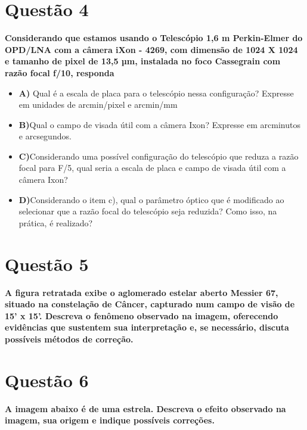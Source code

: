 \documentclass[a4paper, 12pt]{article}
\begin{document}
\section*{Questão 4}
\noindent \textbf{Considerando que estamos usando o Telescópio 1,6 m Perkin-Elmer do OPD/LNA com a câmera iXon - 4269, com dimensão de 1024 X 1024 e tamanho de pixel de 13,5 µm, instalada no foco Cassegrain com razão focal f/10, responda} \\
\begin{itemize}
    \item \textbf{A)} Qual é a escala de placa para o telescópio nessa configuração? Expresse em unidades de arcmin/pixel e arcmin/mm
    \item \textbf{B)}Qual o campo de visada útil com a câmera Ixon? Expresse em arcminutos e arcsegundos.
    \item \textbf{C)}Considerando uma possível configuração do telescópio que reduza a razão focal para F/5, qual seria a escala de placa e campo de visada útil com a câmera Ixon?
    \item \textbf{D)}Considerando o item c), qual o parâmetro óptico que é modificado ao selecionar que a razão focal do telescópio seja reduzida? Como isso, na prática, é realizado?
\end{itemize}

\section*{Questão 5}
\noindent \textbf{A figura retratada exibe o aglomerado estelar aberto Messier 67, situado na constelação de Câncer, capturado num campo de visão de 15' x 15'. Descreva o fenômeno observado na imagem, oferecendo evidências que sustentem sua interpretação e, se necessário, discuta possíveis métodos de correção.} \\

\section*{Questão 6}
\noindent \textbf{A imagem abaixo é de uma estrela. Descreva o efeito observado na imagem, sua origem e indique possíveis correções.} \\
\end{document}
